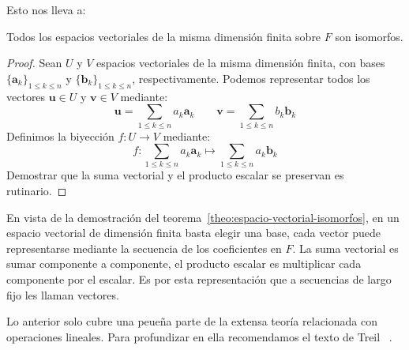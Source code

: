   Esto nos lleva a:
  \begin{theorem}
    \label{theo:espacio-vectorial-isomorfos}
    Todos los espacios vectoriales de la misma dimensión finita
    sobre \(F\) son isomorfos.
  \end{theorem}
  \begin{proof}
    Sean \(U\) y \(V\) espacios vectoriales
    de la misma dimensión finita,
    con bases \(\{\boldsymbol{a}_k\}_{1 \le k \le n}\)
    y \(\{\boldsymbol{b}_k\}_{1 \le k \le n}\),
    respectivamente.
    Podemos representar todos los vectores \(\boldsymbol{u} \in U\)
    y \(\boldsymbol{v} \in V\)
    mediante:
    \begin{equation*}
      \boldsymbol{u}
	= \sum_{1 \le k \le n} a_k \boldsymbol{a}_k \hspace{2em}
      \boldsymbol{v}
	= \sum_{1 \le k \le n} b_k \boldsymbol{b}_k
    \end{equation*}
    Definimos la biyección \(f \colon U \rightarrow V\)
    mediante:
    \begin{equation*}
      f \colon \sum_{1 \le k \le n} a_k \boldsymbol{a}_k
	\mapsto \sum_{1 \le k \le n} a_k \boldsymbol{b}_k
    \end{equation*}
    Demostrar que la suma vectorial
    y el producto escalar se preservan
    es rutinario.
  \end{proof}
  \noindent
  En vista de la demostración
  del teorema~\ref{theo:espacio-vectorial-isomorfos},
  en un espacio vectorial de dimensión finita
  basta elegir una base,
  cada vector puede representarse
  mediante la secuencia de los coeficientes en \(F\).
  La suma vectorial es sumar componente a componente,
  el producto escalar es multiplicar cada componente por el escalar.
  Es por esta representación que a secuencias de largo fijo
  les llaman vectores.

  Lo anterior solo cubre una peueña parte
  de la extensa teoría relacionada con operaciones lineales.
  Para profundizar en ella recomendamos el texto de Treil~%
    \cite{treil14:_linear_algeb_done_wrong}.

